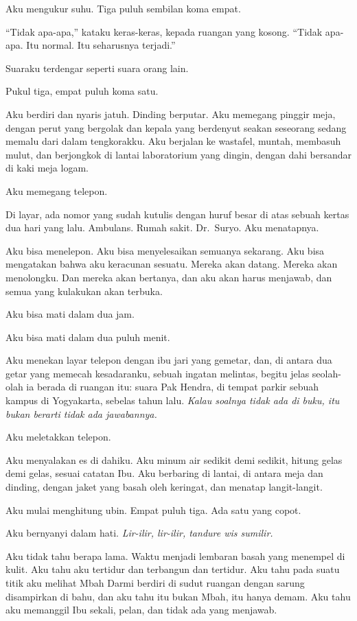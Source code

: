 \documentclass[11pt,twoside,openany]{book}
\begin{document}
Aku mengukur suhu. Tiga puluh sembilan koma empat.

``Tidak apa-apa,'' kataku keras-keras, kepada ruangan yang kosong. ``Tidak apa-apa. Itu normal. Itu seharusnya terjadi.''

Suaraku terdengar seperti suara orang lain.

Pukul tiga, empat puluh koma satu.

Aku berdiri dan nyaris jatuh. Dinding berputar. Aku memegang pinggir meja, dengan perut yang bergolak dan kepala yang berdenyut seakan seseorang sedang memalu dari dalam tengkorakku. Aku berjalan ke wastafel, muntah, membasuh mulut, dan berjongkok di lantai laboratorium yang dingin, dengan dahi bersandar di kaki meja logam.

Aku memegang telepon.

Di layar, ada nomor yang sudah kutulis dengan huruf besar di atas sebuah kertas dua hari yang lalu. Ambulans. Rumah sakit. Dr.~Suryo. Aku menatapnya.

Aku bisa menelepon. Aku bisa menyelesaikan semuanya sekarang. Aku bisa mengatakan bahwa aku keracunan sesuatu. Mereka akan datang. Mereka akan menolongku. Dan mereka akan bertanya, dan aku akan harus menjawab, dan semua yang kulakukan akan terbuka.

Aku bisa mati dalam dua jam.

Aku bisa mati dalam dua puluh menit.

Aku menekan layar telepon dengan ibu jari yang gemetar, dan, di antara dua getar yang memecah kesadaranku, sebuah ingatan melintas, begitu jelas seolah-olah ia berada di ruangan itu: suara Pak Hendra, di tempat parkir sebuah kampus di Yogyakarta, sebelas tahun lalu. \emph{Kalau soalnya tidak ada di buku, itu bukan berarti tidak ada jawabannya.}

Aku meletakkan telepon.

Aku menyalakan es di dahiku. Aku minum air sedikit demi sedikit, hitung gelas demi gelas, sesuai catatan Ibu. Aku berbaring di lantai, di antara meja dan dinding, dengan jaket yang basah oleh keringat, dan menatap langit-langit.

Aku mulai menghitung ubin. Empat puluh tiga. Ada satu yang copot.

Aku bernyanyi dalam hati. \emph{Lir-ilir, lir-ilir, tandure wis sumilir.}

Aku tidak tahu berapa lama. Waktu menjadi lembaran basah yang menempel di kulit. Aku tahu aku tertidur dan terbangun dan tertidur. Aku tahu pada suatu titik aku melihat Mbah Darmi berdiri di sudut ruangan dengan sarung disampirkan di bahu, dan aku tahu itu bukan Mbah, itu hanya demam. Aku tahu aku memanggil Ibu sekali, pelan, dan tidak ada yang menjawab.
\end{document}
